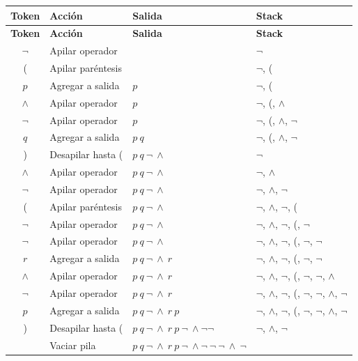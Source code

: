 \documentclass{report}
\begin{document}
	\begin{center}
		\begin{longtable}{|c|l|l|l|}
			\hline
			\textbf{Token} & \textbf{Acción} & \textbf{Salida} & \textbf{Stack} \\
			\hline
			\endfirsthead
			\hline
			\textbf{Token} & \textbf{Acción} & \textbf{Salida} & \textbf{Stack} \\
			\hline
			\endhead
			
			$\neg$ & Apilar operador & & $\neg$ \\
			\hline
			( & Apilar paréntesis & & $\neg$, ( \\
			\hline
			$p$ & Agregar a salida & $p$ & $\neg$, ( \\
			\hline
			$\wedge$ & Apilar operador & $p$ & $\neg$, (, $\wedge$ \\
			\hline
			$\neg$ & Apilar operador & $p$ & $\neg$, (, $\wedge$, $\neg$ \\
			\hline
			$q$ & Agregar a salida & $p\ q$ & $\neg$, (, $\wedge$, $\neg$ \\
			\hline
			) & Desapilar hasta ( & $p\ q\ \neg\ \wedge$ & $\neg$ \\
			\hline
			$\wedge$ & Apilar operador & $p\ q\ \neg\ \wedge$ & $\neg$, $\wedge$ \\
			\hline
			$\neg$ & Apilar operador & $p\ q\ \neg\ \wedge$ & $\neg$, $\wedge$, $\neg$ \\
			\hline
			( & Apilar paréntesis & $p\ q\ \neg\ \wedge$ & $\neg$, $\wedge$, $\neg$, ( \\
			\hline
			$\neg$ & Apilar operador & $p\ q\ \neg\ \wedge$ & $\neg$, $\wedge$, $\neg$, (, $\neg$ \\
			\hline
			$\neg$ & Apilar operador & $p\ q\ \neg\ \wedge$ & $\neg$, $\wedge$, $\neg$, (, $\neg$, $\neg$ \\
			\hline
			$r$ & Agregar a salida & $p\ q\ \neg\ \wedge\ r$ & $\neg$, $\wedge$, $\neg$, (, $\neg$, $\neg$ \\
			\hline
			$\wedge$ & Apilar operador & $p\ q\ \neg\ \wedge\ r$ & $\neg$, $\wedge$, $\neg$, (, $\neg$, $\neg$, $\wedge$ \\
			\hline
			$\neg$ & Apilar operador & $p\ q\ \neg\ \wedge\ r$ & $\neg$, $\wedge$, $\neg$, (, $\neg$, $\neg$, $\wedge$, $\neg$ \\
			\hline
			$p$ & Agregar a salida & $p\ q\ \neg\ \wedge\ r\ p$ & $\neg$, $\wedge$, $\neg$, (, $\neg$, $\neg$, $\wedge$, $\neg$ \\
			\hline
			) & Desapilar hasta ( & $p\ q\ \neg\ \wedge\ r\ p\ \neg\ \wedge \neg \neg$ & $\neg$, $\wedge$, $\neg$ \\
			\hline
			& Vaciar pila & $p\ q\ \neg\ \wedge\ r\ p\ \neg\ \wedge \neg\ \neg\ \neg\ \wedge\ \neg$ &  \\
			\hline
		\end{longtable}
	\end{center}
	\newpage
\end{document}
